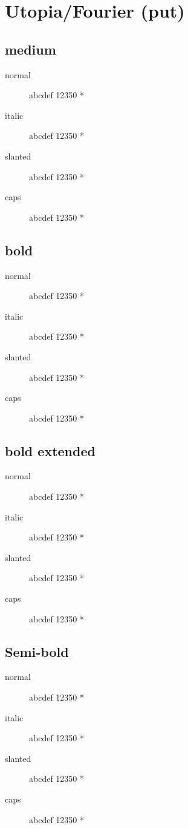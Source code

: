 \section{Utopia/Fourier (put)}

\subsection{medium}
\begin{description}
    \item [normal]  abcdef 12350 *
    \item [italic]  abcdef 12350 *
    \item [slanted]  abcdef 12350 *
    \item [caps]  abcdef 12350 *
\end{description}
    
\subsection{bold}
\begin{description}
    \item [normal]  abcdef 12350 *
    \item [italic]  abcdef 12350 *
    \item [slanted]  abcdef 12350 *
    \item [caps]  abcdef 12350 *
\end{description}
    
\subsection{bold extended}
\begin{description}
    \item [normal]  abcdef 12350 *
    \item [italic]  abcdef 12350 *
    \item [slanted]  abcdef 12350 *
    \item [caps]  abcdef 12350 *
\end{description}

\subsection{Semi-bold}
\begin{description}
    \item [normal]  abcdef 12350 *
    \item [italic]  abcdef 12350 *
    \item [slanted]  abcdef 12350 *
    \item [caps]  abcdef 12350 *
\end{description}


